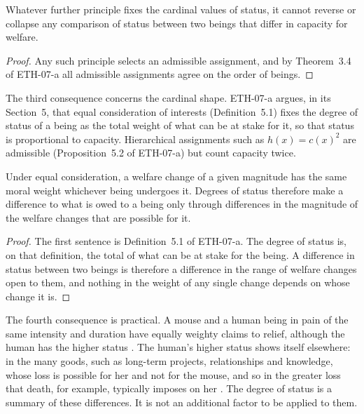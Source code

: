 \documentclass{situationist-preprint}
\begin{document}
\begin{proposition}\label{p:order}
Whatever further principle fixes the cardinal values of status, it cannot reverse or collapse any comparison of status between two beings that differ in capacity for welfare.
\end{proposition}

\begin{proof}
Any such principle selects an admissible assignment, and by Theorem~3.4 of ETH-07-a all admissible assignments agree on the order of beings.
\end{proof}

The third consequence concerns the cardinal shape. ETH-07-a argues, in its Section~5, that equal consideration of interests (Definition~5.1) fixes the degree of status of a being as the total weight of what can be at stake for it, so that status is proportional to capacity. Hierarchical assignments such as $h(x) = c(x)^2$ are admissible (Proposition~5.2 of ETH-07-a) but count capacity twice.

\begin{proposition}\label{p:nomult}
Under equal consideration, a welfare change of a given magnitude has the same moral weight whichever being undergoes it. Degrees of status therefore make a difference to what is owed to a being only through differences in the magnitude of the welfare changes that are possible for it.
\end{proposition}

\begin{proof}
The first sentence is Definition~5.1 of ETH-07-a. The degree of status is, on that definition, the total of what can be at stake for the being. A difference in status between two beings is therefore a difference in the range of welfare changes open to them, and nothing in the weight of any single change depends on whose change it is.
\end{proof}

The fourth consequence is practical. A mouse and a human being in pain of the same intensity and duration have equally weighty claims to relief, although the human has the higher status \citep{Singer1993}. The human's higher status shows itself elsewhere: in the many goods, such as long-term projects, relationships and knowledge, whose loss is possible for her and not for the mouse, and so in the greater loss that death, for example, typically imposes on her \citep{McMahan2002}. The degree of status is a summary of these differences. It is not an additional factor to be applied to them.
\end{document}
